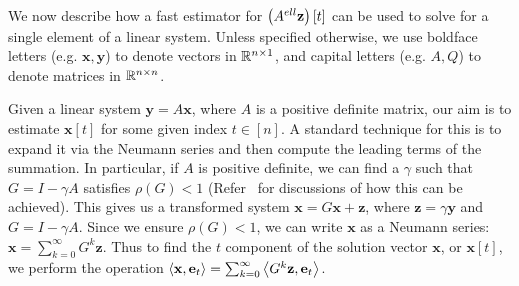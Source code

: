 We now describe how a fast estimator for $\left(A^{ell}\mathbf{z}\right)[t]$ can be used to solve for a single element of a linear system.
Unless specified otherwise, we use boldface letters (e.g. $\mathbf{x},\mathbf{y}$) to denote vectors in $\mathbb{R}^{n\times 1}$, and capital letters (e.g. $A,Q$) to denote matrices in $\mathbb{R}^{n\times n}$.


Given a linear system $\mathbf{y} = A\mathbf{x}$, where $A$ is a positive definite matrix, our aim is to estimate $\mathbf{x}[t]$ for some given index $t\in[n]$. 
A standard technique for this is to expand it via the Neumann series and then compute the leading terms of the summation.
In particular, if $A$ is positive definite, we can find a $\gamma$ such that $G = I - \gamma A$ satisfies $\rho(G) < 1$ (Refer~\cite{dimov2015new,lee2014asynchronous} for discussions of how this can be achieved). 
This gives us a transformed system $\mathbf{x} = G\mathbf{x} + \mathbf{z}$, where $\mathbf{z} = \gamma \mathbf{y}$ and $G = I - \gamma A$. 
Since we ensure $\rho(G)<1$, we can write $\mathbf{x}$ as a Neumann series: $\mathbf{x} = \sum_{k=0}^\infty G^k \mathbf{z}$.
Thus to find the $t$ component of the solution vector $\mathbf{x}$, or $\mathbf{x}[t]$, we perform the operation $\left< \mathbf{x}, \mathbf{e}_t \right> = \sum_{k=0}^\infty \left< G^k \mathbf{z}, \mathbf{e}_t \right>$. 


